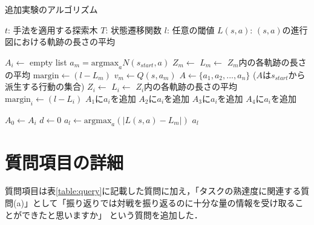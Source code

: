 \begin{algorithm}
    \small
    \caption{追加実験のアルゴリズム}
    \label{alg:myalg-add}
    \begin{algorithmic}[1]
        \State $t$: 手法を適用する探索木
        \State $T$: 状態遷移関数
        \State $l$: 任意の閾値
        \State $L(s, a)$: $(s, a)$の進行図における軌跡の長さの平均

        
        
       
               $A_i \gets $ empty list
           \EndFor
           \State $a_m = \textrm{argmax}_a N(s_{start}, a)$
           \State $Z_m \gets$ 
           \State $L_m \gets $ $Z_m$内の各軌跡の長さの平均
           \State $\textrm{margin} \gets (l-L_m)$
           \State $v_m \gets Q(s, a_m)$
           \State $A \gets \{a_1, a_2, ..., a_n\}$ ($A$は$s_{start}$から派生する行動の集合)
            \State $Z_i \gets$ 
            \State $L_i \gets $ $Z_i$内の各軌跡の長さの平均
            \State $\textrm{margin}_i \gets (l-L_i)$
                    \State $A_1$に$a_i$を追加
                \Else
                    \State $A_2$に$a_i$を追加
                \EndIf
            \Else
                    \State $A_3$に$a_i$を追加
                \Else
                    \State $A_4$に$a_i$を追加
                \EndIf

            \EndIf
           \EndFor

                   $A_0 \gets A_i$
                \EndIf
           \EndFor
           \State $d \gets 0$
           \State $a_l \gets \textrm{argmax}_a (|L(s,a)-L_m|)$
           \State \Return $a_l$
        \EndFunction
    \end{algorithmic}
\end{algorithm}












\section{質問項目の詳細}
質問項目は表\ref{table:query}に記載した質問に加え，「タスクの熟達度に関連する質問(a)」として「振り返りでは対戦を振り返るのに十分な量の情報を受け取ることができたと思いますか」
という質問を追加した．

